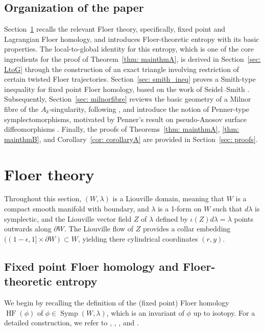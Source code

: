 \documentclass[12pt]{article}
\theoremstyle{theorem}
\theoremstyle{definition}
\theoremstyle{remark}
\numberwithin{equation}{section}
\newcommand{\p}{\partial}
\DeclareMathOperator{\Symp}{Symp}
\DeclareMathOperator{\HF}{HF}
\begin{document}
\subsection*{Organization of the paper}
Section~\ref{sec: floertheory} recalls the relevant Floer theory, specifically, fixed point and Lagrangian Floer homology, and introduces Floer-theoretic entropy with its basic properties.
The local-to-global identity for this entropy, which is one of the core ingredients for the proof of Theorem~\ref{thm: mainthmA}, is derived in Section~\ref{sec: LtoG} through the construction of an exact triangle involving restriction of certain twisted Floer trajectories. 
Section~\ref{sec: smith_ineq} proves a Smith-type inequality for fixed point Floer homology, based on the work of Seidel--Smith \cite{SS}.
Subsequently, Section~\ref{sec: milnorfibre} reviews the basic geometry of a Milnor fibre of the $A_k$-singularity, following \cite[Section~6c]{KhSe02}, and introduce the notion of Penner-type symplectomorphisms, motivated by Penner's result on pseudo-Anosov surface diffeomorphisms \cite{Pe88}.
Finally, the proofs of Theorems~\ref{thm: mainthmA}, \ref{thm: mainthmB}, and Corollary~\ref{cor: corollaryA} are provided in Section~\ref{sec: proofs}.
\section{Floer theory}\label{sec: floertheory}
Throughout this section, $(W,\lambda)$ is a Liouville domain, meaning that $W$ is a compact smooth manifold with boundary, and $\lambda$ is a 1-form on $W$ such that $d\lambda$ is symplectic, and the Liouville vector field $Z$ of $\lambda$ defined by $\iota(Z)d\lambda=\lambda$ points outwards along $\p W$.
The Liouville flow of $Z$ provides a collar embedding $((1-\epsilon,1]\times \p W)\subset W$, yielding there cylindrical coordinates $(r,y)$.

\subsection{Fixed point Floer homology and Floer-theoretic entropy}\label{sec: fixedfloer}
We begin by recalling the definition of the (fixed point) Floer homology $\HF(\phi)$ of $\phi\in \Symp(W,\lambda)$, which is an invariant of $\phi$ up to isotopy.
For a detailed construction, we refer to \cite{Ul17}, \cite[Section~4]{Se01}, \cite[Section~2.2]{Mc12}, and \cite[Section~4]{Mc19}.
\end{document}
